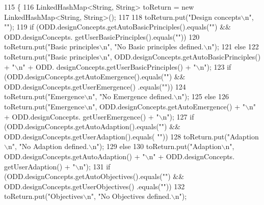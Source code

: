 \begin{DoxyCode}
115                                                                    \{
116         LinkedHashMap<String, String> toReturn = \textcolor{keyword}{new} LinkedHashMap<String, String>();
117 
118         toReturn.put(\textcolor{stringliteral}{"Design concepts\(\backslash\)n"}, \textcolor{stringliteral}{""});
119         \textcolor{keywordflow}{if} (ODD.designConcepts.getAutoBasicPrinciples().equals(\textcolor{stringliteral}{""}) && ODD.designConcepts.
      getUserBasicPrinciples().equals(\textcolor{stringliteral}{""}))
120             toReturn.put(\textcolor{stringliteral}{"Basic principles\(\backslash\)n"}, \textcolor{stringliteral}{"No Basic principles defined.\(\backslash\)n"});
121         \textcolor{keywordflow}{else}
122             toReturn.put(\textcolor{stringliteral}{"Basic principles\(\backslash\)n"}, ODD.designConcepts.getAutoBasicPrinciples() + \textcolor{stringliteral}{"\(\backslash\)n"} + ODD.
      designConcepts.getUserBasicPrinciples() + \textcolor{stringliteral}{"\(\backslash\)n"});
123         \textcolor{keywordflow}{if} (ODD.designConcepts.getAutoEmergence().equals(\textcolor{stringliteral}{""}) && ODD.designConcepts.getUserEmergence()
      .equals(\textcolor{stringliteral}{""}))
124             toReturn.put(\textcolor{stringliteral}{"Emergence\(\backslash\)n"}, \textcolor{stringliteral}{"No Emergence defined.\(\backslash\)n"});
125         \textcolor{keywordflow}{else}
126             toReturn.put(\textcolor{stringliteral}{"Emergence\(\backslash\)n"}, ODD.designConcepts.getAutoEmergence() + \textcolor{stringliteral}{"\(\backslash\)n"} + ODD.designConcepts.
      getUserEmergence() + \textcolor{stringliteral}{"\(\backslash\)n"});
127         \textcolor{keywordflow}{if} (ODD.designConcepts.getAutoAdaption().equals(\textcolor{stringliteral}{""}) && ODD.designConcepts.getUserAdaption().equals(\textcolor{stringliteral}{
      ""}))
128             toReturn.put(\textcolor{stringliteral}{"Adaption\(\backslash\)n"}, \textcolor{stringliteral}{"No Adaption defined.\(\backslash\)n"});
129         \textcolor{keywordflow}{else}
130             toReturn.put(\textcolor{stringliteral}{"Adaption\(\backslash\)n"}, ODD.designConcepts.getAutoAdaption() + \textcolor{stringliteral}{"\(\backslash\)n"} + ODD.designConcepts.
      getUserAdaption() + \textcolor{stringliteral}{"\(\backslash\)n"});
131         \textcolor{keywordflow}{if} (ODD.designConcepts.getAutoObjectives().equals(\textcolor{stringliteral}{""}) && ODD.designConcepts.getUserObjectives()
      .equals(\textcolor{stringliteral}{""}))
132             toReturn.put(\textcolor{stringliteral}{"Objectives\(\backslash\)n"}, \textcolor{stringliteral}{"No Objectives defined.\(\backslash\)n"});

\end{DoxyCode}
